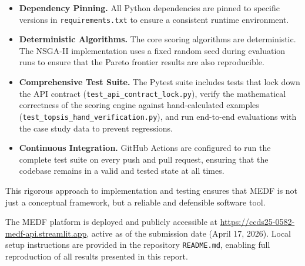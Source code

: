 \begin{itemize}[leftmargin=2em]
  \item \textbf{Dependency Pinning.} All Python dependencies are pinned to specific versions in \texttt{requirements.txt} to ensure a consistent runtime environment.

  \item \textbf{Deterministic Algorithms.} The core scoring algorithms are deterministic. The NSGA-II implementation uses a fixed random seed during evaluation runs to ensure that the Pareto frontier results are also reproducible.

  \item \textbf{Comprehensive Test Suite.} The Pytest suite includes tests that lock down the API contract (\texttt{test\_api\_contract\_lock.py}), verify the mathematical correctness of the scoring engine against hand-calculated examples (\texttt{test\_topsis\_hand\_verification.py}), and run end-to-end evaluations with the case study data to prevent regressions.

  \item \textbf{Continuous Integration.} GitHub Actions are configured to run the complete test suite on every push and pull request, ensuring that the codebase remains in a valid and tested state at all times.
\end{itemize}

This rigorous approach to implementation and testing ensures that MEDF is not just a conceptual framework, but a reliable and defensible software tool.

The MEDF platform is deployed and publicly accessible at \url{https://ccds25-0582-medf-api.streamlit.app}, active as of the submission date (April 17, 2026). Local setup instructions are provided in the repository \texttt{README.md}, enabling full reproduction of all results presented in this report.
